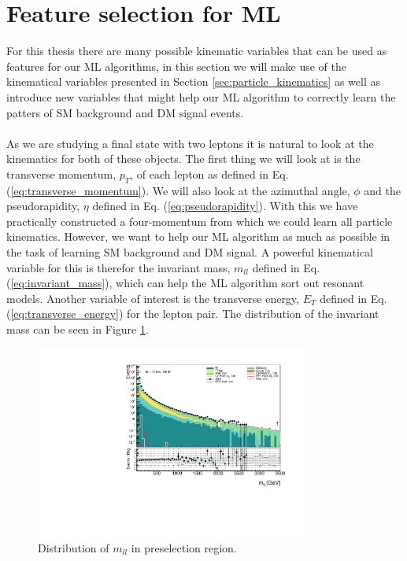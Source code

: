 \documentclass[12pt, a4paper]{book}
\begin{document}
\section{Feature selection for ML}
For this thesis there are many possible kinematic variables that can be used as features for our ML algorithms, in this section we will make use of the kinematical variables presented in Section \ref{sec:particle_kinematics} as well as introduce new variables that 
might help our ML algorithm to correctly learn the patters of SM background and DM signal events. \\
\\As we are studying a final state with two leptons it is natural to look at the kinematics for both of these objects. The first thing we will look at is the transverse momentum, $p_T$, of each lepton as defined in Eq. (\ref{eq:transverse_momentum}). 
We will also look at the azimuthal angle, $\phi$ and the pseudorapidity, $\eta$ defined in Eq. (\ref{eq:pseudorapidity}). 
With this we have practically constructed a four-momentum from which we could learn all particle kinematics. However, we want to help our ML algorithm as much as possible in the task of learning SM background and DM signal. A powerful kinematical variable for this is 
therefor the invariant mass, $m_{ll}$ defined in Eq. (\ref{eq:invariant_mass}), which can help the ML algorithm sort out resonant models. Another variable of interest is the transverse energy, $E_T$ defined in Eq. (\ref{eq:transverse_energy}) for the lepton pair. 
The distribution of the invariant mass can be seen in Figure \ref{fig:mll_dist}.\\
\graphicspath{{../../../Plots/Data_Analysis/SRs/Control_region/}} 
\begin{figure}[!ht]
    \centering
        \includegraphics[width=0.8\textwidth]{mll.pdf}
    \caption{Distribution of $m_{ll}$ in preselection region.}\label{fig:mll_dist}
\end{figure}
\end{document}
